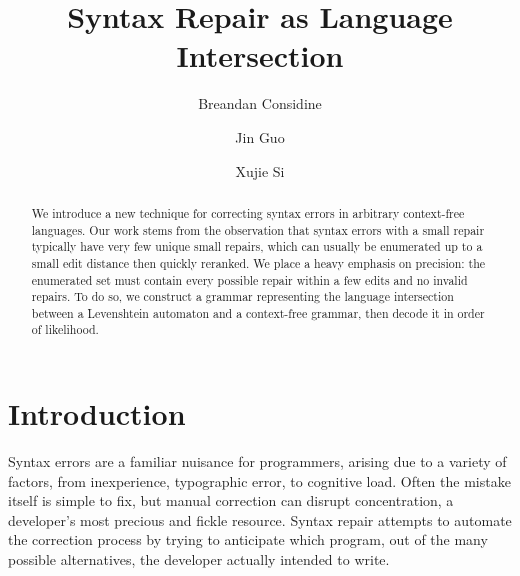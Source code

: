 \documentclass[sigplan,acmsmall,nonacm,screen]{acmart}\settopmatter{printfolios=false,printccs=false,printacmref=false}
\begin{document}
%
  \title{Syntax Repair as Language Intersection}
  \begin{abstract}
    We introduce a new technique for correcting syntax errors in arbitrary context-free languages. Our work stems from the observation that syntax errors with a small repair typically have very few unique small repairs, which can usually be enumerated up to a small edit distance then quickly reranked. We place a heavy emphasis on precision: the enumerated set must contain every possible repair within a few edits and no invalid repairs. To do so, we construct a grammar representing the language intersection between a Levenshtein automaton and a context-free grammar, then decode it in order of likelihood.
  \end{abstract}

%
  \author{Breandan Considine}
%
%

  \author{Jin Guo}
  \author{Xujie Si}

  \maketitle

  \section{Introduction}

  Syntax errors are a familiar nuisance for programmers, arising due to a variety of factors, from inexperience, typographic error, to cognitive load. Often the mistake itself is simple to fix, but manual correction can disrupt concentration, a developer's most precious and fickle resource. Syntax repair attempts to automate the correction process by trying to anticipate which program, out of the many possible alternatives, the developer actually intended to write.
\end{document}
